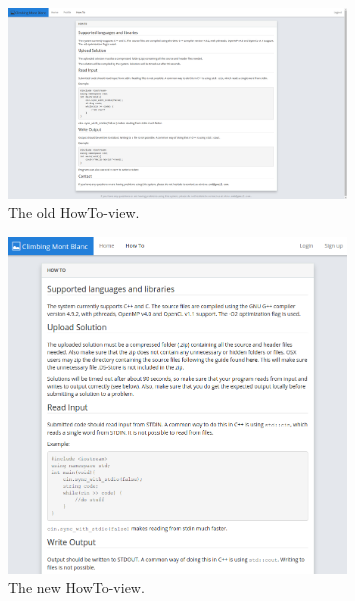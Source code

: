 \begin{figure}[h!]
    \centering
    \includegraphics[width=0.8\textwidth]{oldscreenshots/howto.png}
    \caption[]{The old HowTo-view.}
    \label{fig:apdx-old-howto}
\end{figure}

\begin{figure}[h!]
    \centering
    \includegraphics[width=0.8\textwidth]{screenshots/howto.png}
    \caption[]{The new HowTo-view.}
    \label{fig:apdx-new-howto}
\end{figure}
